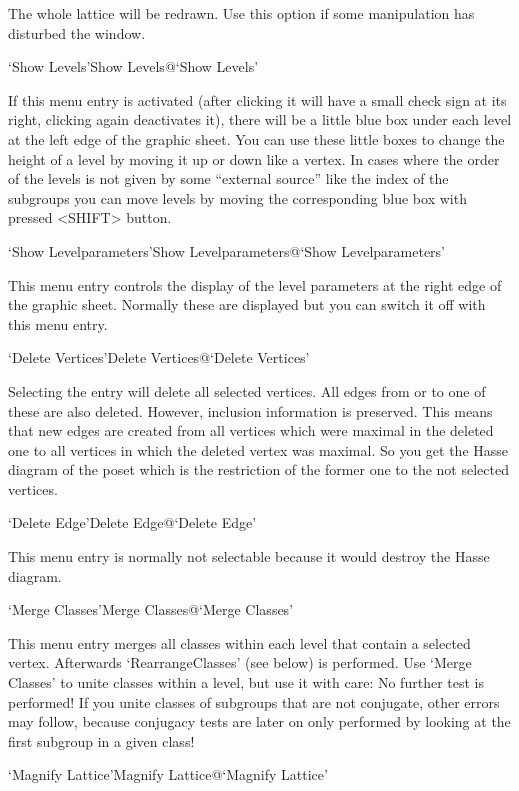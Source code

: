   The whole lattice will be redrawn. Use this option if some manipulation
  has disturbed the window.
  
\>`Show Levels'{Show Levels}@{`Show Levels'}

  If this menu entry is activated (after clicking it will have a small
  check sign at its right, clicking again deactivates it), there will be a
  little blue box under each level at the left edge of the graphic
  sheet. You can use these little boxes to change the height of a level by
  moving it up or down like a vertex. In cases where the order of the
  levels is not given by some ``external source'' like the index of the
  subgroups you can move levels by moving the corresponding blue box with
  pressed <SHIFT> button.
  
\>`Show Levelparameters'{Show Levelparameters}@{`Show Levelparameters'}

  This menu entry controls the display of the level parameters at the right 
  edge of the graphic sheet. Normally these are displayed but you can
  switch it off with this menu entry.

\>`Delete Vertices'{Delete Vertices}@{`Delete Vertices'}

  Selecting the entry will delete all selected vertices. All edges from or
  to one of these are also deleted. However, inclusion information is
  preserved. This means that new edges are created from all vertices which
  were maximal in the deleted one to all vertices in which the deleted
  vertex was maximal. So you get the Hasse diagram of the poset which is
  the restriction of the former one to the not selected vertices.

\>`Delete Edge'{Delete Edge}@{`Delete Edge'}

  This menu entry is normally not selectable because it would destroy the
  Hasse diagram.
  
\>`Merge Classes'{Merge Classes}@{`Merge Classes'}

This menu  entry merges all  classes within each  level that contain a
selected  vertex.    Afterwards  `RearrangeClasses'  (see   below)  is
performed.  Use `Merge Classes' to  unite classes within a level,  but
use it  with care: No further test  is performed! If you unite classes
of subgroups that are not conjugate, other  errors may follow, because
conjugacy tests  are later on only  performed by  looking at the first
subgroup in a given class!

\>`Magnify Lattice'{Magnify Lattice}@{`Magnify Lattice'}

